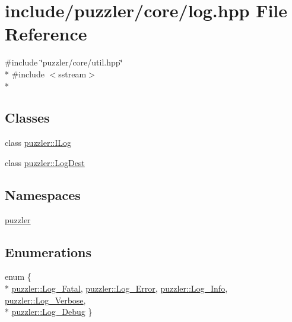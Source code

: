 \hypertarget{a00120}{}\section{include/puzzler/core/log.hpp File Reference}
\label{a00120}
{\ttfamily \#include \char`\"{}puzzler/core/util.\+hpp\char`\"{}}\\*
{\ttfamily \#include $<$sstream$>$}\\*
\subsection*{Classes}
\begin{DoxyCompactItemize}
\item 
class \hyperlink{a00008}{puzzler\+::\+I\+Log}
\item 
class \hyperlink{a00014}{puzzler\+::\+Log\+Dest}
\end{DoxyCompactItemize}
\subsection*{Namespaces}
\begin{DoxyCompactItemize}
\item 
 \hyperlink{a00145}{puzzler}
\end{DoxyCompactItemize}
\subsection*{Enumerations}
\begin{DoxyCompactItemize}
\item 
enum \{ \\*
\hyperlink{a00145_a708d6d338b0023c48ad539fa780befd4a6be2f2c64ba3c32922caf8011d9e26ef}{puzzler\+::\+Log\+\_\+\+Fatal}, 
\hyperlink{a00145_a708d6d338b0023c48ad539fa780befd4aba793b246a9be54235871c8283268b5c}{puzzler\+::\+Log\+\_\+\+Error}, 
\hyperlink{a00145_a708d6d338b0023c48ad539fa780befd4ab61cfe6429cf195c3090426de048b63d}{puzzler\+::\+Log\+\_\+\+Info}, 
\hyperlink{a00145_a708d6d338b0023c48ad539fa780befd4a9460a6125c5f5dc355540756200a8f1c}{puzzler\+::\+Log\+\_\+\+Verbose}, 
\\*
\hyperlink{a00145_a708d6d338b0023c48ad539fa780befd4ad0a133142120418b69861a205e3e1d1d}{puzzler\+::\+Log\+\_\+\+Debug}
 \}
\end{DoxyCompactItemize}

